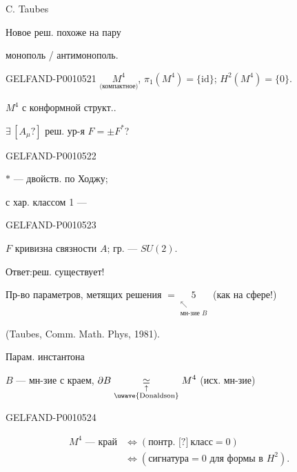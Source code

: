 C. Taubes

Новое реш. похоже на пару

монополь / антимонополь.


\begin{GelfandAdjacentEvidence}{GELFAND-P001052}{1}
\quad
$\underset{\text{(компактное)}}{M^4}$,
$\pi_1(M^4)=\{\mathrm{id}\}$;
$H^2(M^4)=\{0\}$.

$M^4$ с конформной структ..

$\exists\, [A_\mu?]$ реш. ур-я $F=\pm F^*$?
\end{GelfandAdjacentEvidence}
\begin{GelfandAdjacentEvidence}{GELFAND-P001052}{2}


$*$ — двойств. по Ходжу;

с хар. классом 1 — \uwave{[напр.?]}
\end{GelfandAdjacentEvidence}
\begin{GelfandAdjacentEvidence}{GELFAND-P001052}{3}


$F$ кривизна связности $A$; гр. — $SU(2)$.

Ответ:\quad реш. существует!

Пр-во параметров, метящих решения
$\displaystyle=\underset{\substack{\nwarrow\\\text{мн-зие }B}}{5}$
\qquad (как на сфере!)

(Taubes, Comm. Math. Phys, 1981).

Парам. инстантона

$B$ — мн-зие с краем,
$\displaystyle\partial B\underset{\substack{\uparrow\\\text{\uwave{Donaldson}}}}{\simeq}M^4$
\quad (исх. мн-зие)
\end{GelfandAdjacentEvidence}
\begin{GelfandAdjacentEvidence}{GELFAND-P001052}{4}


\begin{align*}
M^4\text{ — край}
&\Longleftrightarrow(\text{понтр. }\text{[?]}\ \text{класс}=0)\\
&\Longleftrightarrow(\text{сигнатура}=0\text{ для формы в }H^2).
\end{align*}
\end{GelfandAdjacentEvidence}

